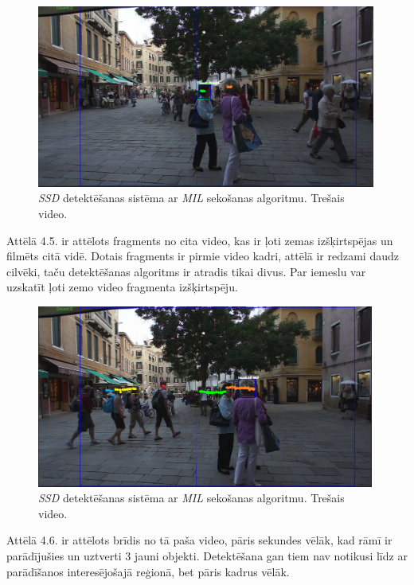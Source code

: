 \begin{figure}[h]%
	\centering
	\includegraphics[height=6cm]{images/ssd5.png} %
	\caption{\textit{SSD} detektēšanas sistēma ar \textit{MIL} sekošanas algoritmu. Trešais video.}%
	\label{fig:example}%
\end{figure}

Attēlā 4.5. ir attēlots fragments no cita video, kas ir ļoti zemas izšķirtspējas un filmēts citā vidē. Dotais fragments ir pirmie video kadri, attēlā ir redzami daudz cilvēki, taču detektēšanas algoritms ir atradis tikai divus. Par iemeslu var uzskatīt ļoti zemo video fragmenta izšķirtspēju.

\begin{figure}[h]%
	\centering
	\includegraphics[height=6cm]{images/ssd6.png} %
	\caption{\textit{SSD} detektēšanas sistēma ar \textit{MIL} sekošanas algoritmu. Trešais video.}%
	\label{fig:example}%
\end{figure}

Attēlā 4.6. ir attēlots brīdis no tā paša video, pāris sekundes vēlāk, kad rāmī ir parādījušies un uztverti 3 jauni objekti. Detektēšana gan tiem nav notikusi līdz ar parādīšanos interesējošajā reģionā, bet pāris kadrus vēlāk. 

